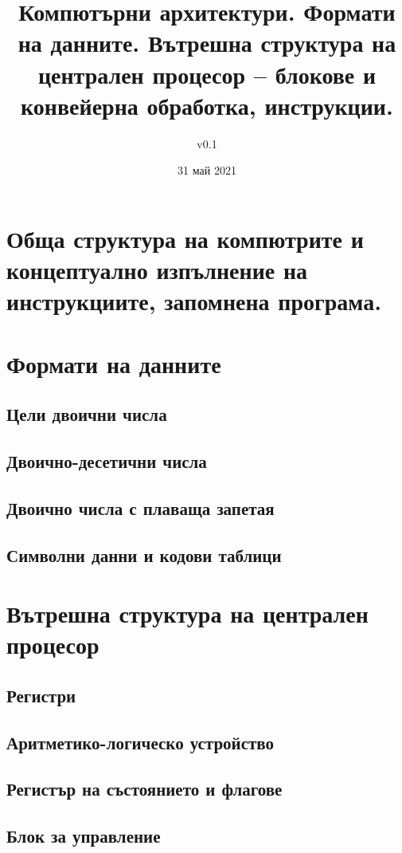 \documentclass[fleqn,12pt]{article}
\title{Компютърни архитектури. Формати на данните. Вътрешна структура на централен процесор – блокове и конвейерна обработка, инструкции.}
\author{v0.1}
\date{31 май 2021}
\begin{document}
\maketitle

\tableofcontents

\begin{flushleft}

\section{Обща структура на компютрите и концептуално изпълнение на инструкциите,
запомнена програма.}

\section{Формати на данните}
\subsection{Цели двоични числа}
\subsection{Двоично-десетични числа}
\subsection{Двоично числа с плаваща запетая}
\subsection{Символни данни и кодови таблици}

\section{Вътрешна структура на централен процесор}
\subsection{Регистри}
\subsection{Аритметико-логическо устройство}
\subsection{Регистър на състоянието и флагове}
\subsection{Блок за управление}


\end{flushleft}
\end{document}
